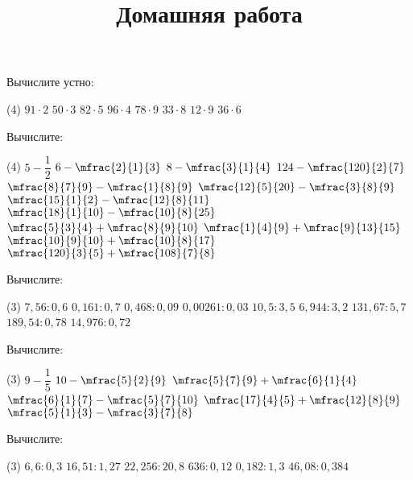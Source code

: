 \begin{class}[number=2]
	\begin{listofex}
		\item Вычислите устно:
		\begin{tasks}(4)
			\task \( 91\cdot2 \)
			\task \( 50\cdot3 \)
			\task \( 82\cdot5 \)
			\task \( 96\cdot4 \)
			\task \( 78\cdot9 \)
			\task \( 33\cdot8 \)
			\task \( 12\cdot9 \)
			\task \( 36\cdot6 \)
		\end{tasks}
		\item Вычислите:
		\begin{tasks}(4)
			\task \( 5-\dfrac{1}{2} \)
			\task \( 6-\mfrac{2}{1}{3} \)
			\task \( 8-\mfrac{3}{1}{4} \)
			\task \( 124-\mfrac{120}{2}{7} \)
			\task \( \mfrac{8}{7}{9}-\mfrac{1}{8}{9} \)
			\task \( \mfrac{12}{5}{20}-\mfrac{3}{8}{9} \)
			\task \( \mfrac{15}{1}{2}-\mfrac{12}{8}{11} \)
			\task \( \mfrac{18}{1}{10}-\mfrac{10}{8}{25} \)
			\task \( \mfrac{5}{3}{4}+\mfrac{8}{9}{10} \)
			\task \( \mfrac{1}{4}{9}+\mfrac{9}{13}{15} \)
			\task \( \mfrac{10}{9}{10}+\mfrac{10}{8}{17} \)
			\task \( \mfrac{120}{3}{5}+\mfrac{108}{7}{8} \)
		\end{tasks}
		\item Вычислите:
		\begin{tasks}(3)
			\task \( 7,56:0,6 \)
			\task \( 0,161:0,7 \)
			\task \( 0,468:0,09 \)
			\task \( 0,00261:0,03 \)
			\task \( 10,5:3,5 \)
			\task \( 6,944:3,2 \)
			\task \( 131,67:5,7 \)
			\task \( 189,54:0,78 \)
			\task \( 14,976:0,72 \)
		\end{tasks}
	\end{listofex}
	\newpage
	\title{Домашняя работа}
	\begin{listofex}
		\item Вычислите:
		\begin{tasks}(3)
			\task \( 9-\dfrac{1}{5} \)
			\task \( 10-\mfrac{5}{2}{9} \)
			\task \( \mfrac{5}{7}{9}+\mfrac{6}{1}{4} \)
			\task \( \mfrac{6}{1}{7}-\mfrac{5}{7}{10} \)
			\task \( \mfrac{17}{4}{5}+\mfrac{12}{8}{9} \)
			\task \( \mfrac{5}{1}{3}-\mfrac{3}{7}{8} \)
		\end{tasks}
		\item Вычислите:
		\begin{tasks}(3)
			\task \( 6,6:0,3 \)
			\task \( 16,51:1,27 \)
			\task \( 22,256:20,8 \)
			\task \( 636:0,12 \)
			\task \( 0,182:1,3 \)
			\task \( 46,08:0,384 \)
		\end{tasks}
	\end{listofex}
\end{class}

